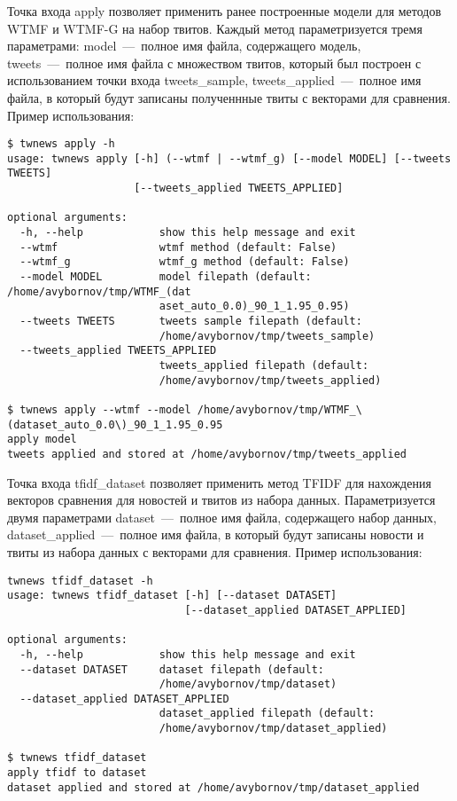         Точка входа apply позволяет применить ранее построенные модели для методов WTMF и WTMF-G на набор твитов.
        Каждый метод параметризуется тремя параметрами: model~---~полное имя файла, содержащего модель,
        tweets~---~полное имя файла с множеством твитов, который был построен с использованием точки входа tweets\_sample,
        tweets_applied~---~полное имя файла, в который будут записаны полученнные твиты с векторами для сравнения.
        Пример использования:
        \begin{lstlisting}
$ twnews apply -h
usage: twnews apply [-h] (--wtmf | --wtmf_g) [--model MODEL] [--tweets TWEETS]
                    [--tweets_applied TWEETS_APPLIED]

optional arguments:
  -h, --help            show this help message and exit
  --wtmf                wtmf method (default: False)
  --wtmf_g              wtmf_g method (default: False)
  --model MODEL         model filepath (default: /home/avybornov/tmp/WTMF_(dat
                        aset_auto_0.0)_90_1_1.95_0.95)
  --tweets TWEETS       tweets sample filepath (default:
                        /home/avybornov/tmp/tweets_sample)
  --tweets_applied TWEETS_APPLIED
                        tweets_applied filepath (default:
                        /home/avybornov/tmp/tweets_applied)

$ twnews apply --wtmf --model /home/avybornov/tmp/WTMF_\(dataset_auto_0.0\)_90_1_1.95_0.95
apply model
tweets applied and stored at /home/avybornov/tmp/tweets_applied

        \end{lstlisting}


        Точка входа tfidf\_dataset позволяет применить метод TFIDF для нахождения векторов сравнения для новостей и твитов из набора данных.
        Параметризуется двумя параметрами
        dataset~---~полное имя файла, содержащего набор данных,
        dataset_applied~---~полное имя файла, в который будут записаны новости и твиты из набора данных с векторами для сравнения.
        Пример использования:
        \begin{lstlisting}
twnews tfidf_dataset -h
usage: twnews tfidf_dataset [-h] [--dataset DATASET]
                            [--dataset_applied DATASET_APPLIED]

optional arguments:
  -h, --help            show this help message and exit
  --dataset DATASET     dataset filepath (default:
                        /home/avybornov/tmp/dataset)
  --dataset_applied DATASET_APPLIED
                        dataset_applied filepath (default:
                        /home/avybornov/tmp/dataset_applied)

$ twnews tfidf_dataset
apply tfidf to dataset
dataset applied and stored at /home/avybornov/tmp/dataset_applied
        \end{lstlisting}

